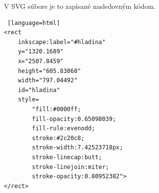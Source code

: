 V SVG súbore je to zapísané nasledovným kódom. 


\begin{lstlisting} [language=html]
<rect
	inkscape:label="#hladina"
	y="1320.1689"
	x="2507.8459"
	height="605.83868"
	width="797.04492"
	id="hladina"
	style=
		"fill:#0000ff;
		fill-opacity:0.65098039;
		fill-rule:evenodd;
		stroke:#2c20c8;
		stroke-width:7.42523718px;
		stroke-linecap:butt;
		stroke-linejoin:miter;
		stroke-opacity:0.80952382">
</rect>

\end{lstlisting}


%
%
%
%
